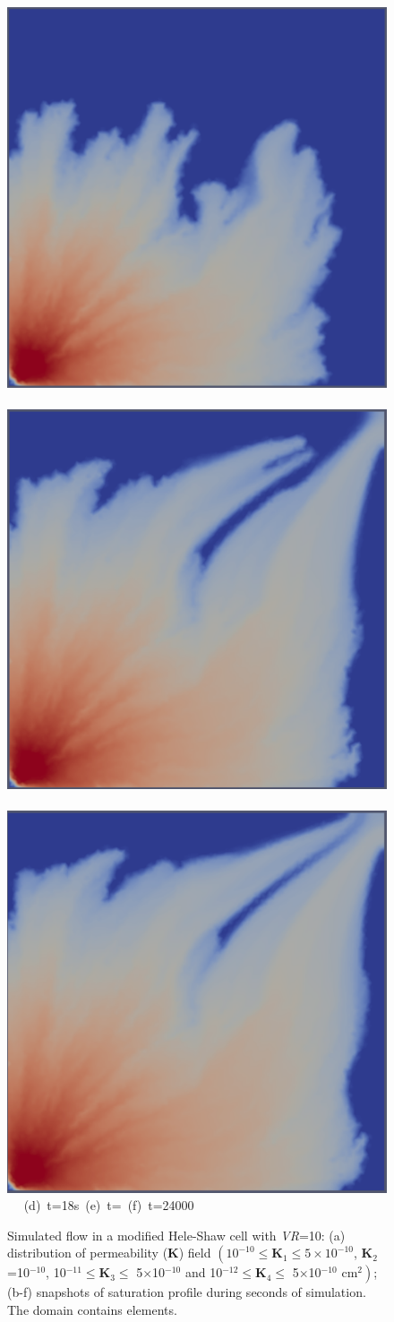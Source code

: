 \begin{landscape}
\begin{figure}[ht]
{      \vspace{0.5cm}
      \hbox{\includegraphics[width=.5\textwidth]{./Pics1/Saffman_heterogeneous/saffman_heter_fixed_3000.pdf}
            \includegraphics[width=.5\textwidth]{./Pics1/Saffman_heterogeneous/saffman_heter_fixed_6000.pdf}
            \includegraphics[width=.5\textwidth]{./Pics1/Saffman_heterogeneous/saffman_heter_fixed_24000.pdf} }
      \hbox{\hspace{2.5cm} (d) t=18s \hspace{5.cm} (e) t= \hspace{3.0cm} (f) t=24000 }}
\caption{Simulated flow in a modified Hele-Shaw cell with {\it VR}=10: (a) distribution of permeability ({\bf K}) field $\left(\text{10}^{-10}\le\mathbf{K}_{1}\le\text{5}\times\text{10}^{-10}\right.$, {\bf K}$_{2}$=10$^{-10}$, 10$^{-11}\le\mathbf{K}_{3}\le$ 5$\times$10$^{-10}$ and 10$^{-12}\le\mathbf{K}_{4}\le$ 5$\times$10$\left.^{-10}\text{ cm}^{2}\right)$; (b-f) snapshots of saturation profile during  seconds of simulation. The domain contains elements.}
\label{fig:HeleShawHeter_VR10}
\end{figure}
\end{landscape}
\clearpage



